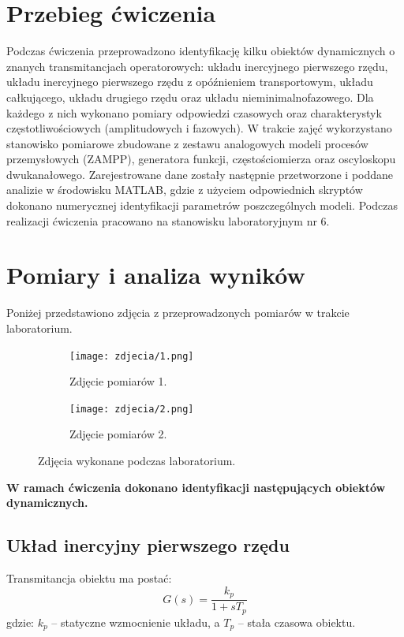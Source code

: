 \documentclass[12pt,a4paper]{article}
\begin{document}
	\section{Przebieg ćwiczenia}
	Podczas ćwiczenia przeprowadzono identyfikację kilku obiektów dynamicznych o znanych transmitancjach operatorowych: układu inercyjnego pierwszego rzędu, układu inercyjnego pierwszego rzędu z opóźnieniem transportowym, układu całkującego, układu drugiego rzędu oraz układu nieminimalnofazowego. Dla każdego z nich wykonano pomiary odpowiedzi czasowych oraz charakterystyk częstotliwościowych (amplitudowych i fazowych). W trakcie zajęć wykorzystano stanowisko pomiarowe zbudowane z zestawu analogowych modeli procesów przemysłowych (ZAMPP), generatora funkcji, częstościomierza oraz oscyloskopu dwukanałowego. Zarejestrowane dane zostały następnie przetworzone i poddane analizie w środowisku MATLAB, gdzie z użyciem odpowiednich skryptów dokonano numerycznej identyfikacji parametrów poszczególnych modeli.
	Podczas realizacji ćwiczenia pracowano na stanowisku laboratoryjnym nr 6.
	
	\newpage
	\section{Pomiary i analiza wyników}
	Poniżej przedstawiono zdjęcia z przeprowadzonych pomiarów w trakcie laboratorium.
	
	\begin{figure}[H]
		\centering
		\begin{subfigure}[b]{0.48\textwidth}
			\centering
			\texttt{[image: zdjecia/1.png]}
			\caption{Zdjęcie pomiarów 1.}
			\label{fig:pomiar1}
		\end{subfigure}
		\hfill
		\begin{subfigure}[b]{0.48\textwidth}
			\centering
			\texttt{[image: zdjecia/2.png]}
			\caption{Zdjęcie pomiarów 2.}
			\label{fig:pomiar2}
		\end{subfigure}
		\caption{Zdjęcia wykonane podczas laboratorium.}
	\end{figure}
	
	\textbf {W ramach ćwiczenia dokonano identyfikacji następujących obiektów dynamicznych.}
	
	\subsection{Układ inercyjny pierwszego rzędu}
	Transmitancja obiektu ma postać:
	\begin{equation}
		G(s) = \frac{k_p}{1 + sT_p}
	\end{equation}
	gdzie: \(k_p\) – statyczne wzmocnienie układu, a \(T_p\) – stała czasowa obiektu.
	
\end{document}
